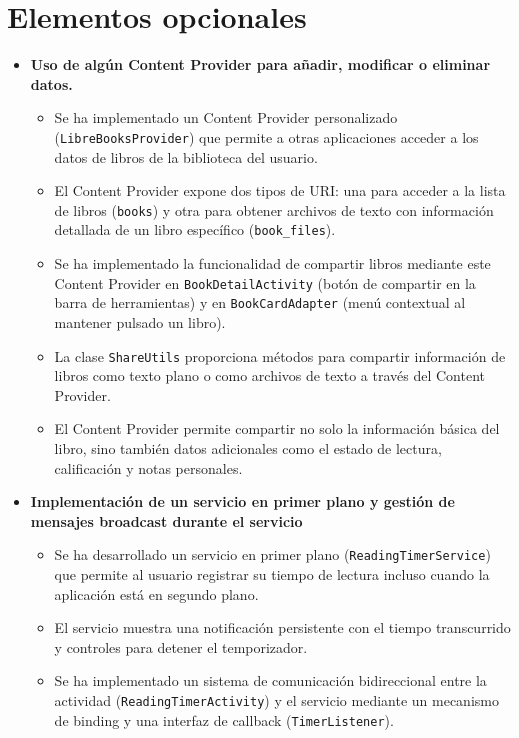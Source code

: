 \documentclass[a4paper,11pt]{report}
\begin{document}
    \section{Elementos opcionales}
      \begin{itemize}
        \item \textbf{Uso de algún Content Provider para añadir, modificar o eliminar datos.}
          \begin{itemize}
            \item Se ha implementado un Content Provider personalizado (\texttt{LibreBooksProvider}) que permite a otras aplicaciones acceder a los datos de libros de la biblioteca del usuario.
            \item El Content Provider expone dos tipos de URI: una para acceder a la lista de libros (\texttt{books}) y otra para obtener archivos de texto con información detallada de un libro específico (\texttt{book\_files}).
            \item Se ha implementado la funcionalidad de compartir libros mediante este Content Provider en \texttt{BookDetailActivity} (botón de compartir en la barra de herramientas) y en \texttt{BookCardAdapter} (menú contextual al mantener pulsado un libro).
            \item La clase \texttt{ShareUtils} proporciona métodos para compartir información de libros como texto plano o como archivos de texto a través del Content Provider.
            \item El Content Provider permite compartir no solo la información básica del libro, sino también datos adicionales como el estado de lectura, calificación y notas personales.
          \end{itemize}
        \item \textbf{Implementación de un servicio en primer plano y gestión de mensajes broadcast durante el servicio}
          \begin{itemize}
            \item Se ha desarrollado un servicio en primer plano (\texttt{ReadingTimerService}) que permite al usuario registrar su tiempo de lectura incluso cuando la aplicación está en segundo plano.
            \item El servicio muestra una notificación persistente con el tiempo transcurrido y controles para detener el temporizador.
            \item Se ha implementado un sistema de comunicación bidireccional entre la actividad (\texttt{ReadingTimerActivity}) y el servicio mediante un mecanismo de binding y una interfaz de callback (\texttt{TimerListener}).

\end{itemize}
\end{itemize}
\end{document}
